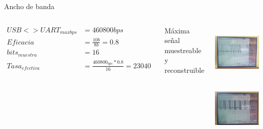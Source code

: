  \begin{frame}[t]{Ancho de banda}{}
    \handsonicon
    \begin{columns}[onlytextwidth]
       \begin{align*}
          USB<>UART_{max bps} &= 460800 bps \\
          Eficacia                 &= \frac{10b}{8b} = 0.8\\
          bits_{muestra}           &= 16 \\
          Tasa_{efectiva}          &= \frac{460800_{bps}*0.8}{16} = 23040
       \end{align*}
          \begin{block}{Máxima señal muestreable y reconstruible}
          \end{block}
       \center\includegraphics[width=6cm,height=2.8cm]{2_clase/osci1}
       \center\includegraphics[width=6cm,height=2.8cm]{2_clase/osci2}
    \end{columns}
    \vfill
 \end{frame}
